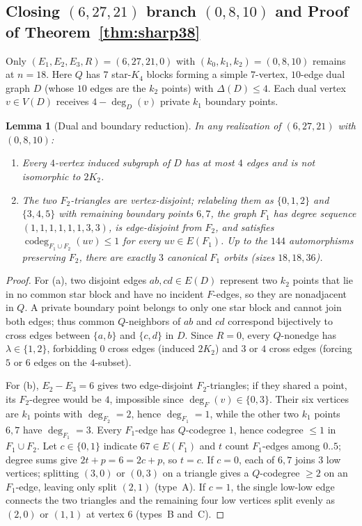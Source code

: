 \documentclass[11pt]{amsart}
\newtheorem{lemma}[theorem]{Lemma}
\theoremstyle{definition}
\theoremstyle{remark}
\begin{document}
\subsection{Closing $(6,27,21)$ branch $(0,8,10)$ and Proof of Theorem~\ref{thm:sharp38}}

Only $(E_1, E_2, E_3, R) = (6, 27, 21, 0)$ with $(k_0, k_1, k_2) = (0, 8, 10)$ remains at $n=18$. Here $Q$ has $7$ star-$K_4$ blocks forming a simple $7$-vertex, $10$-edge dual graph $D$ (whose $10$ edges are the $k_2$ points) with $\Delta(D) \le 4$. Each dual vertex $v \in V(D)$ receives $4 - \deg_D(v)$ private $k_1$ boundary points.

\begin{lemma}[Dual and boundary reduction]\label{lem:dual_red}
In any realization of $(6,27,21)$ with $(0,8,10)$:
\begin{enumerate}[label=(\alph*)]
\item Every $4$-vertex induced subgraph of $D$ has at most $4$ edges and is not isomorphic to $2K_2$.
\item The two $F_2$-triangles are vertex-disjoint; relabeling them as $\{0,1,2\}$ and $\{3,4,5\}$ with remaining boundary points $6, 7$, the graph $F_1$ has degree sequence $(1,1,1,1,1,1,3,3)$, is edge-disjoint from $F_2$, and satisfies $\operatorname{codeg}_{F_1 \cup F_2}(uv) \le 1$ for every $uv \in E(F_1)$. Up to the $144$ automorphisms preserving $F_2$, there are exactly $3$ canonical $F_1$ orbits (sizes $18, 18, 36$).
\end{enumerate}
\end{lemma}

\begin{proof}
For (a), two disjoint edges $ab, cd \in E(D)$ represent two $k_2$ points that lie in no common star block and have no incident $F$-edges, so they are nonadjacent in $Q$. A private boundary point belongs to only one star block and cannot join both edges; thus common $Q$-neighbors of $ab$ and $cd$ correspond bijectively to cross edges between $\{a,b\}$ and $\{c,d\}$ in $D$. Since $R = 0$, every $Q$-nonedge has $\lambda \in \{1,2\}$, forbidding $0$ cross edges (induced $2K_2$) and $3$ or $4$ cross edges (forcing $5$ or $6$ edges on the $4$-subset).

For (b), $E_2 - E_3 = 6$ gives two edge-disjoint $F_2$-triangles; if they shared a point, its $F_2$-degree would be $4$, impossible since $\deg_F(v) \in \{0, 3\}$. Their six vertices are $k_1$ points with $\deg_{F_2}=2$, hence $\deg_{F_1}=1$, while the other two $k_1$ points $6, 7$ have $\deg_{F_1}=3$. Every $F_1$-edge has $Q$-codegree $1$, hence codegree $\le 1$ in $F_1 \cup F_2$. Let $c \in \{0,1\}$ indicate $67 \in E(F_1)$ and $t$ count $F_1$-edges among $0..5$; degree sums give $2t + p = 6 = 2c + p$, so $t = c$. If $c = 0$, each of $6, 7$ joins $3$ low vertices; splitting $(3,0)$ or $(0,3)$ on a triangle gives a $Q$-codegree $\ge 2$ on an $F_1$-edge, leaving only split $(2,1)$ (type~A). If $c = 1$, the single low-low edge connects the two triangles and the remaining four low vertices split evenly as $(2,0)$ or $(1,1)$ at vertex $6$ (types~B and~C).
\end{proof}
\end{document}
